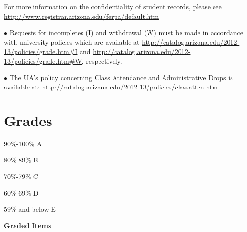 \documentclass[
]{book}
\begin{document}
For more information on the confidentiality of student records, please see \url{http://www.registrar.arizona.edu/ferpa/default.htm}

\(\bullet\) Requests for incompletes (I) and withdrawal (W) must be made in accordance with university policies which are available at \url{http://catalog.arizona.edu/2012-13/policies/grade.htm\#I} and \url{http://catalog.arizona.edu/2012-13/policies/grade.htm\#W}, respectively.

\(\bullet\) The UA's policy concerning Class Attendance and Administrative Drops is available at: \url{http://catalog.arizona.edu/2012-13/policies/classatten.htm}

\section{Grades}\label{grades}

90\%-100\% A

80\%-89\% B

70\%-79\% C

60\%-69\% D

59\% and below E

\textbf{Graded Items}
\end{document}
